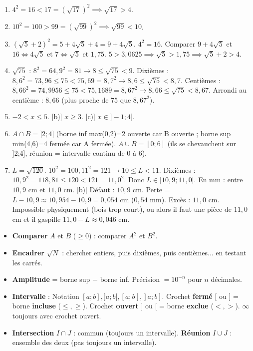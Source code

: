 \documentclass[11pt]{article}
\begin{document}
\begin{corrige}[Exercice n°1]
\begin{enumerate}
    \item[a)] $4^2=16 < 17=(\sqrt{17})^2 \implies \sqrt{17} > 4$.
    \item[b)] $10^2=100 > 99=(\sqrt{99})^2 \implies \sqrt{99} < 10$.
    \item[c)] $(\sqrt{5}+2)^2 = 5 + 4\sqrt{5} + 4 = 9 + 4\sqrt{5}$. $4^2=16$. Comparer $9+4\sqrt{5}$ et $16 \iff 4\sqrt{5}$ et $7 \iff \sqrt{5}$ et $1,75$. $5 > 3,0625 \implies \sqrt{5} > 1,75 \implies \sqrt{5}+2 > 4$.
    \item $\sqrt{75}$ : $8^2=64, 9^2=81 \to 8 \le \sqrt{75} < 9$.
    Dixièmes : $8,6^2=73,96 \le 75 < 75,69=8,7^2 \to 8,6 \le \sqrt{75} < 8,7$.
    Centièmes : $8,66^2=74,9956 \le 75 < 75,1689=8,67^2 \to 8,66 \le \sqrt{75} < 8,67$.
    Arrondi au centième : $8,66$ (plus proche de $75$ que $8,67^2$).
    \item[a)] $-2 < x \le 5$. [b)] $x \ge 3$. [c)] $x \in ]-1 ; 4]$.
    \item $A \cap B = ]2 ; 4]$ (borne inf max(0,2)=2 ouverte car B ouverte ; borne sup min(4,6)=4 fermée car A fermée).
    $A \cup B = [0 ; 6]$ (ils se chevauchent sur ]2;4], réunion = intervalle continu de 0 à 6).
    \item[a)] $L=\sqrt{120}$. $10^2=100, 11^2=121 \to 10 \le L < 11$.
    Dixièmes : $10,9^2=118,81 \le 120 < 121=11,0^2$. Donc $L \in [10,9 ; 11,0[$.
    En mm : entre $10,9$ cm et $11,0$ cm.
    [b)] Défaut : $10,9$ cm. Perte = $L - 10,9 \approx 10,954 - 10,9 = 0,054$ cm ($0,54$ mm).
    Excès : $11,0$ cm. Impossible physiquement (bois trop court), ou alors il faut une pièce de $11,0$ cm et il gaspille $11,0 - L \approx 0,046$ cm.
\end{enumerate}
\end{corrige}

\begin{aretenir}
\begin{itemize}
    \item \textbf{Comparer} $A$ et $B$ ($\ge 0$) : comparer $A^2$ et $B^2$.
    \item \textbf{Encadrer} $\sqrt{N}$ : chercher entiers, puis dixièmes, puis centièmes... en testant les carrés.
    \item \textbf{Amplitude} = borne sup $-$ borne inf. Précision $= 10^{-n}$ pour $n$ décimales.
    \item \textbf{Intervalle} : Notation $[a;b], ]a;b[, [a;b[, ]a;b]$. Crochet \textbf{fermé} $[$ ou $]$ = borne \textbf{incluse} ($\le, \ge$). Crochet \textbf{ouvert} $]$ ou $[$ = borne \textbf{exclue} ($<, >$). $\infty$ toujours avec crochet ouvert.
    \item \textbf{Intersection} $I \cap J$ : commun (toujours un intervalle). \textbf{Réunion} $I \cup J$ : ensemble des deux (pas toujours un intervalle).
\end{itemize}
\end{aretenir}
\end{document}
